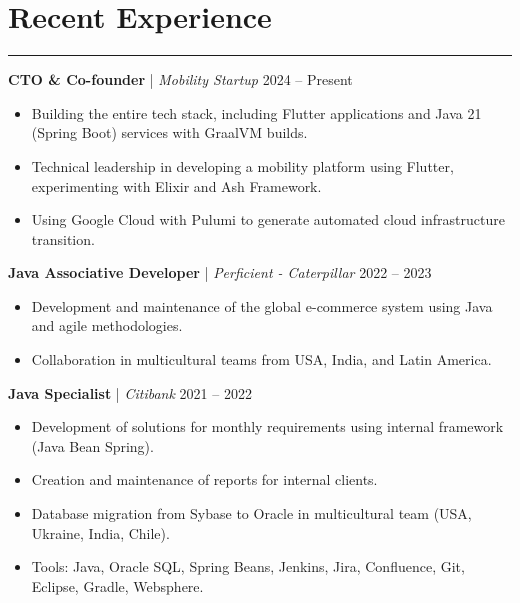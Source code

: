 \documentclass[11pt,a4paper]{article}
\begin{document}
\section*{Recent Experience}
\hrule
\vspace{5pt}
\textbf{CTO \& Co-founder} | \textit{Mobility Startup} \hfill 2024 -- Present \\
\begin{itemize}[noitemsep, topsep=0pt]
    \item Building the entire tech stack, including Flutter applications and Java 21 (Spring Boot) services with GraalVM builds.
    \item Technical leadership in developing a mobility platform using Flutter, experimenting with Elixir and Ash Framework.
    \item Using Google Cloud with Pulumi to generate automated cloud infrastructure transition.
\end{itemize}

\vspace{8pt}

\textbf{Java Associative Developer} | \textit{Perficient - Caterpillar} \hfill 2022 -- 2023 \\
\begin{itemize}[noitemsep, topsep=0pt]
    \item Development and maintenance of the global e-commerce system using Java and agile methodologies.
    \item Collaboration in multicultural teams from USA, India, and Latin America.
\end{itemize}

\vspace{8pt}

\textbf{Java Specialist} | \textit{Citibank} \hfill 2021 -- 2022 \\
\begin{itemize}[noitemsep, topsep=0pt]
    \item Development of solutions for monthly requirements using internal framework (Java Bean Spring).
    \item Creation and maintenance of reports for internal clients.
    \item Database migration from Sybase to Oracle in multicultural team (USA, Ukraine, India, Chile).
    \item Tools: Java, Oracle SQL, Spring Beans, Jenkins, Jira, Confluence, Git, Eclipse, Gradle, Websphere.
\end{itemize}
\end{document}
